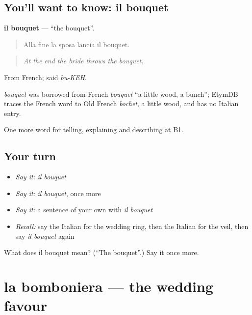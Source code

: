 \subsection*{You'll want to know: il bouquet}
\textbf{il bouquet} — \textquotedblleft{}the bouquet\textquotedblright{}.

\begin{quote}
Alla fine la sposa lancia il bouquet.
\end{quote}

\begin{quote}
\emph{At the end the bride throws the bouquet.}
\end{quote}

From French; said \emph{bu-KEH}.

\begin{cousinweb}
\emph{bouquet} was borrowed from French \emph{bouquet} \textquotedblleft{}a little wood, a bunch\textquotedblright{}; EtymDB traces the French word to Old French \emph{bochet}, a little wood, and has no Italian entry.
\end{cousinweb}

\begin{grammarlens}[title={What you've built}]
One more word for telling, explaining and describing at B1.
\end{grammarlens}

\subsection*{Your turn}
\begin{itemize}
\raggedright
  \item \emph{Say it:} \emph{il bouquet}
  \item \emph{Say it:} \emph{il bouquet}, once more
  \item \emph{Say it:} a sentence of your own with \emph{il bouquet}
  \item \emph{Recall:} say the Italian for the wedding ring, then the Italian for the veil, then say \emph{il bouquet} again
\end{itemize}

\begin{tcolorbox}[breakable,colback=teal!4,colframe=teal!35!black,title={Before you move on}]
What does il bouquet mean? (\textquotedblleft{}The bouquet\textquotedblright{}.) Say it once more.
\end{tcolorbox}
\section[la bomboniera]{la bomboniera — the wedding favour}

